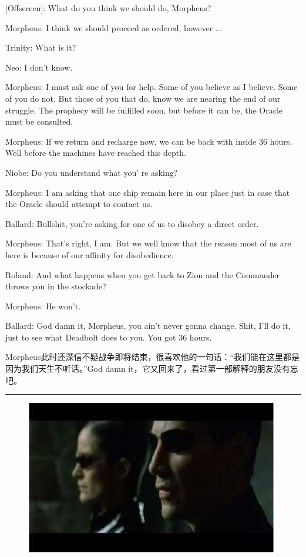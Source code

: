 \documentclass{ctexart}
\newcommand{\myparsep}{\noindent \rule[0.5ex]{\linewidth}{1pt}}
\newenvironment{myquote}{\color{green} \setlength{\leftskip}{6em} \setlength{\rightskip}{4em} \setlength{\parindent}{-2em}}{\par}
\begin{document}
\begin{myquote}
[Offscreen]: What do you think we should do, Morpheus?

Morpheus: I think we should proceed as ordered, however ...

Trinity: What is it?

Neo: I don't know.

Morpheus: I must ask one of you for help. Some of you believe as I believe. Some of you do not. But those of you that do, know we are nearing the end of our struggle. The prophecy will be fulfilled soon, but before it can be, the Oracle must be consulted.

Morpheus: If we return and recharge now, we can be back with inside 36 hours. Well before the machines have reached this depth.

Niobe: Do you understand what you' re asking?

Morpheus: I am asking that one ship remain here in our place just in case that the Oracle should attempt to contact us.

Ballard: Bullshit, you're asking for one of us to disobey a direct order.

Morpheus: That's right, I am. But we well know that the reason most of us are here is because of our affinity for disobedience.

Roland: And what happens when you get back to Zion and the Commander throws you in the stockade?

Morpheus: He won't.

Ballard: God damn it, Morpheus, you ain't never gonna change. Shit, I'll do it, just to see what Deadbolt does to you. You got 36 hours.
\end{myquote}

Morpheus此时还深信不疑战争即将结束，很喜欢他的一句话：“我们能在这里都是因为我们天生不听话。”God damn it，它又回来了，看过第一部解释的朋友没有忘吧。

\myparsep

\begin{figure}[htb]
\centering
\includegraphics[width=0.5\linewidth]{fig/read_reloaded-17}
\end{figure}
\end{document}
